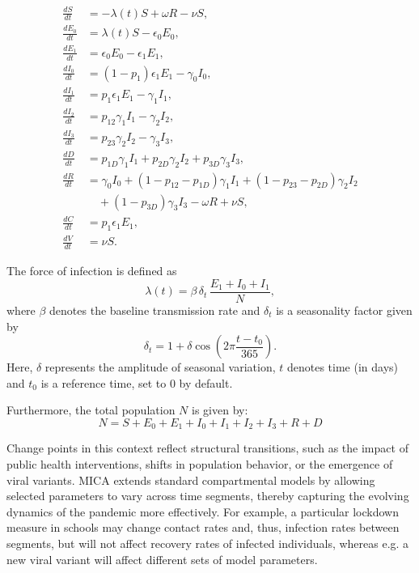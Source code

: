 \documentclass[10pt,letterpaper]{article}
\begin{document}
\begin{align}
\frac{dS}{dt} &= - \lambda(t) S + \omega R - \nu S, \nonumber\\
\frac{dE_0}{dt} &= \lambda(t) S - \epsilon_0 E_0, \nonumber\\
\frac{dE_1}{dt} &= \epsilon_0 E_0 - \epsilon_1 E_1, \nonumber\\
\frac{dI_0}{dt} &= (1 - p_1) \epsilon_1 E_1 - \gamma_0 I_0, \nonumber\\
\frac{dI_1}{dt} &= p_1 \epsilon_1 E_1 - \gamma_1 I_1, \label{eq:cov} \\
\frac{dI_2}{dt} &= p_{12} \gamma_1 I_1 - \gamma_2 I_2, \nonumber \\
\frac{dI_3}{dt} &= p_{23} \gamma_2 I_2 - \gamma_3 I_3, \nonumber\\
\frac{dD}{dt} &= p_{1D} \gamma_1 I_1 + p_{2D} \gamma_2 I_2 + p_{3D} \gamma_3 I_3, \nonumber\\
\frac{dR}{dt} &= \gamma_0 I_0 + (1 - p_{12} - p_{1D}) \gamma_1 I_1 + (1 - p_{23} - p_{2D}) \gamma_2 I_2 \nonumber\\
&\quad + (1 - p_{3D}) \gamma_3 I_3 - \omega R + \nu S, \nonumber\\
\frac{dC}{dt} &= p_1 \epsilon_1 E_1, \nonumber\\
\frac{dV}{dt} &= \nu S. \nonumber
\end{align}

The force of infection is defined as
\[
\lambda(t) = \beta \, \delta_t \, \frac{E_1 + I_0 + I_1}{N},
\]
where \(\beta\) denotes the baseline transmission rate and
\(\delta_t\) is a seasonality factor given by
\[
\delta_t = 1 + \delta \cos\!\left(2\pi \frac{t - t_0}{365}\right).
\]
Here, \(\delta\) represents the amplitude of seasonal variation, \(t\) denotes
time (in days) and \(t_0\) is a reference time, set to \(0\) by default.


Furthermore, the total population \(N\) is given by:
\[
N = S + E_0 + E_1 + I_0 + I_1 + I_2 + I_3 + R + D
\]

Change points in this context reflect structural transitions, such as the impact of public health interventions, shifts in population behavior, or the emergence of viral variants. MICA extends standard compartmental models by allowing selected parameters to vary across time segments, thereby capturing the evolving dynamics of the pandemic more effectively. For example, a particular lockdown measure in schools may change contact rates and, thus, infection rates between segments, but will not affect recovery rates of infected individuals, whereas e.g. a new viral variant will affect different sets of model parameters.
\end{document}
